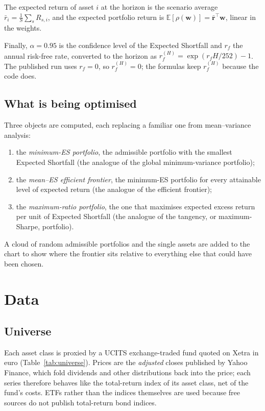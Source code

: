 \documentclass[11pt,a4paper]{article}
\newcommand{\E}{\mathbb{E}}
\newcommand{\w}{\mathbf{w}}
\newcommand{\rr}{\mathbf{r}}
\theoremstyle{plain}
\theoremstyle{remark}
\begin{document}
The expected return of asset $i$ at the horizon is the scenario average
$\bar r_i = \frac1S \sum_s R_{s,i}$, and the expected portfolio return is
$\E[\rho(\w)] = \bar{\rr}^\top \w$, linear in the weights.

Finally, $\alpha = 0.95$ is the confidence level of the Expected Shortfall
and $r_f$ the annual risk-free rate, converted to the horizon as
$r_f^{(H)} = \exp(r_f H/252) - 1$. The published run uses $r_f = 0$, so
$r_f^{(H)} = 0$; the formulas keep $r_f^{(H)}$ because the code does.

\subsection{What is being optimised}

Three objects are computed, each replacing a familiar one from
mean--variance analysis:
\begin{enumerate}[nosep]
  \item the \emph{minimum-ES portfolio}, the admissible portfolio with the
        smallest Expected Shortfall (the analogue of the global
        minimum-variance portfolio);
  \item the \emph{mean--ES efficient frontier}, the minimum-ES portfolio for
        every attainable level of expected return (the analogue of the
        efficient frontier);
  \item the \emph{maximum-ratio portfolio}, the one that maximises expected
        excess return per unit of Expected Shortfall (the analogue of the
        tangency, or maximum-Sharpe, portfolio).
\end{enumerate}
A cloud of random admissible portfolios and the single assets are added to
the chart to show where the frontier sits relative to everything else that
could have been chosen.

\section{Data}
\label{sec:data}

\subsection{Universe}

Each asset class is proxied by a UCITS exchange-traded fund quoted on Xetra
in euro (Table~\ref{tab:universe}). Prices are the \emph{adjusted} closes
published by Yahoo Finance, which fold dividends and other distributions
back into the price; each series therefore behaves like the total-return
index of its asset class, net of the fund's costs. ETFs rather than the
indices themselves are used because free sources do not publish total-return
bond indices.
\end{document}

